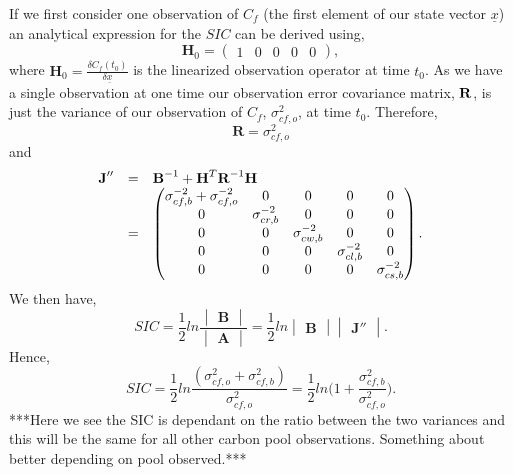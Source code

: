 \documentclass[11pt]{article}
\begin{document}
If we first consider one observation of $C_f$ (the first element of our state vector $\underline{x}$) an analytical expression for the $SIC$ can be derived using,
\[
\textbf{H}_{0} = \begin{pmatrix}
1 & 0 & 0 & 0 & 0
\end{pmatrix},
\] 
where $\textbf{H}_{0}=\frac{\delta C_f(t_0)}{\delta\underline{x}}$ is the linearized observation operator at time $t_0$. As we have a single observation at one time our observation error covariance matrix, $\bf{R}$, is just the variance of our observation of $C_f$, $\sigma_{cf,o}^{2}$, at time $t_0$. Therefore,
\[
\textbf{R}=\sigma_{cf,o}^{2}
\]  
and
\[
\begin{array} {lcl}
\textbf{J}'' &=& \textbf{B}^{-1}+\textbf{H}^{T}\textbf{R}^{-1}\bf{H} \\
&=& \begin{pmatrix} 
\sigma_{cf,b}^{-2}+\sigma_{cf,o}^{-2} & 0 & 0 & 0 & 0 \\
0 & \sigma_{cr,b}^{-2} & 0 & 0 & 0 \\
0 & 0 & \sigma_{cw,b}^{-2} & 0 & 0 \\
0 & 0 & 0 & \sigma_{cl,b}^{-2} & 0 \\
0 & 0 & 0 & 0 & \sigma_{cs,b}^{-2} \\
\end{pmatrix}.
\end{array}
\] 
We then have,
\[
SIC=\frac{1}{2}ln\frac{\begin{vmatrix} \textbf{B} \end{vmatrix}}{\begin{vmatrix} \textbf{A} \end{vmatrix}} = \frac{1}{2}ln\begin{vmatrix} \textbf{B} \end{vmatrix}\begin{vmatrix} \textbf{J}'' \end{vmatrix}.
\]
Hence,
\[
SIC = \frac{1}{2}ln\frac{(\sigma_{cf,o}^{2}+\sigma_{cf,b}^{2})}{\sigma_{cf,o}^{2}}
=\frac{1}{2}ln \bigg(1+\frac{\sigma_{cf,b}^{2}}{\sigma_{cf,o}^{2}}\bigg).
\]
***Here we see the SIC is dependant on the ratio between the two variances and this will be the same for all other carbon pool observations. Something about better depending on pool observed.*** 
\end{document}
